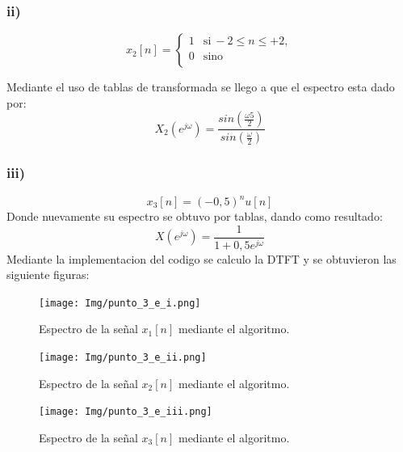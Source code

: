 \documentclass[letterpaper]{article}
\begin{document}
\subsubsection*{ii)}
\begin{equation} 
    x_{2}[n] = \left\{ 
    \begin{array}{ll} 
    1 & \mathrm{si\ } -2\leq n \leq +2, \\
    0 & \mathrm{sino\ } \\
    \end{array} 
    \right.
\end{equation}

Mediante el uso de tablas de transformada se llego a que el espectro esta dado por:
\begin{equation}
X_{2}(e^{j \omega})= \frac{sin(\frac{ \omega 5}{2})}{sin (\frac{\omega}{2})}
\end{equation}

\subsubsection*{iii)}
\begin{equation} 
    x_{3}[n]=(-0,5)^{n}u[n]
\end{equation}
Donde nuevamente su espectro se obtuvo por tablas, dando como resultado:
\begin{equation}
X(e^{j \omega})=\frac{1}{1+0,5 e^{j \omega}}
\end{equation}
Mediante la implementacion del codigo se calculo la DTFT y se obtuvieron las siguiente figuras:
\begin{figure}[H]
\centering
\texttt{[image: Img/punto\_3\_e\_i.png]}
\caption{Espectro de la señal $x_{1}[n]$ mediante el algoritmo.}
\label{fig.3ei}
\end{figure}

\begin{figure}[H]
\centering
\texttt{[image: Img/punto\_3\_e\_ii.png]}
\caption{Espectro de la señal $x_{2}[n]$ mediante el algoritmo.}
\label{fig.3eii}
\end{figure}

\begin{figure}[H]
\centering
\texttt{[image: Img/punto\_3\_e\_iii.png]}
\caption{Espectro de la señal $x_{3}[n]$ mediante el algoritmo.}
\label{fig.3eiii}
\end{figure}
\end{document}

